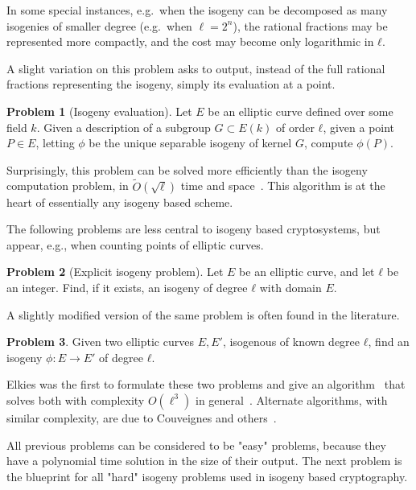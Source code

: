 \documentclass[10pt]{article}
\theoremstyle{plain}
\theoremstyle{definition}
\newtheorem{problem}{Problem}
\def\tildO{\ensuremath{\tilde{O}}}
\begin{document}
\begin{prposition}
In some special instances, e.g.\ when the isogeny can be decomposed as
many isogenies of smaller degree (e.g.\ when $\ell = 2^n$), the
rational fractions may be represented more compactly, and the cost may
become only logarithmic in $ℓ$.

A slight variation on this problem asks to output, instead of the full
rational fractions representing the isogeny, simply its evaluation at
a point.

\begin{problem}[Isogeny evaluation]
  Let $E$ be an elliptic curve defined over some field $k$. %
  Given a description of a subgroup $G⊂E(k)$ of order $ℓ$, given a
  point $P∈E$, letting $ϕ$ be the unique separable isogeny of kernel
  $G$, compute $ϕ(P)$.
\end{problem}

Surprisingly, this problem can be solved more efficiently than the
isogeny computation problem, in $\tildO(\sqrt{ℓ})$ time and
space~\cite{bernstein2020faster}. %
This algorithm is at the heart of essentially any isogeny based
scheme.

The following problems are less central to isogeny based
cryptosystems, but appear, e.g., when counting points of elliptic
curves.

\begin{problem}[Explicit isogeny problem]
  \label{prob:expl-isog}
  Let $E$ be an elliptic curve, and let $ℓ$ be an integer. %
  Find, if it exists, an isogeny of degree $ℓ$ with domain $E$.
\end{problem}

A slightly modified version of the same problem is often found in the
literature.

\begin{problem}
  Given two elliptic curves $E,E'$, isogenous of known degree $ℓ$,
  find an isogeny $ϕ:E\to E'$ of degree $ℓ$.
\end{problem}

Elkies was the first to formulate these two problems and give an
algorithm~\cite{elkies92,elkies98} that solves both with complexity
$O(\ell^3)$ in
general~\cite{bostan+morain+salvy+schost08,lercier+sirvent08}. %
Alternate algorithms, with similar complexity, are due to Couveignes
and
others~\cite{couveignes94,couveignes96,couveignes00,df+schost09,defeo2016explicit}.

All previous problems can be considered to be "easy" problems,
because they have a polynomial time solution in the size of their
output. %
The next problem is the blueprint for all "hard" isogeny problems used in
isogeny based cryptography. %


\end{prposition}
\end{document}
